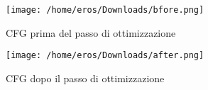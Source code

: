 \documentclass[letterpaper, 11pt]{article}
\begin{document}
\begin{figure}[htbp]
\centering
\texttt{[image: /home/eros/Downloads/bfore.png]}
\caption{CFG prima del passo di ottimizzazione}
\end{figure}
\begin{figure}[htbp]
\centering
\texttt{[image: /home/eros/Downloads/after.png]}
\caption{CFG dopo il passo di ottimizzazione}
\end{figure}
\end{document}
